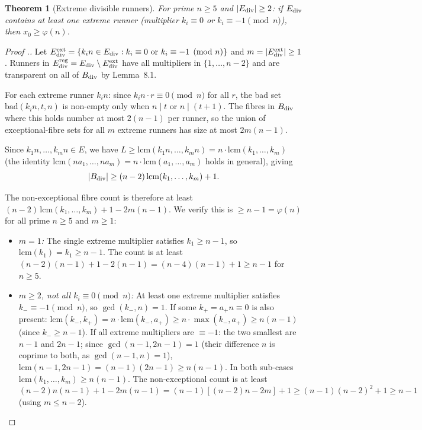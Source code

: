 \documentclass[11pt,a4paper]{article}
\theoremstyle{plain}
\newtheorem{theorem}{Theorem}[section]
\theoremstyle{definition}
\theoremstyle{remark}
\begin{document}
\begin{theorem}[Extreme divisible runners]
For prime $n \geq 5$ and $|E_{\rm div}| \geq 2$: if $E_{\rm div}$ contains at least one extreme runner (multiplier $k_i \equiv 0$ or $k_i \equiv -1 \pmod{n}$), then $x_0 \geq \varphi(n)$.

\end{theorem}

\begin{proof}[Proof .]
Let $E_{\rm div}^{\rm ext} = \{k_i n \in E_{\rm div} : k_i \equiv 0 \text{ or } k_i \equiv -1 \pmod{n}\}$ and $m = |E_{\rm div}^{\rm ext}| \geq 1$. Runners in $E_{\rm div}^{\rm reg} = E_{\rm div} \setminus E_{\rm div}^{\rm ext}$ have all multipliers in $\{1,\ldots,n-2\}$ and are transparent on all of $B_{\rm div}$ by Lemma~8.1.

For each extreme runner $k_i n$: since $k_i n \cdot r \equiv 0 \pmod{n}$ for all $r$, the bad set $\mathrm{bad}(k_i n, t, n)$ is non-empty only when $n \mid t$ or $n \mid (t+1)$. The fibres in $B_{\rm div}$ where this holds number at most $2(n-1)$ per runner, so the union of exceptional-fibre sets for all $m$ extreme runners has size at most $2m(n-1)$.

Since $k_1 n, \ldots, k_m n \in E$, we have $L \geq \mathrm{lcm}(k_1 n, \ldots, k_m n) = n\cdot\mathrm{lcm}(k_1,\ldots,k_m)$ (the identity $\mathrm{lcm}(na_1,\ldots,na_m) = n\cdot\mathrm{lcm}(a_1,\ldots,a_m)$ holds in general), giving
\[|B_{\rm div}| \geq (n-2)\,\mathrm{lcm}(k_1,\ldots,k_m)+1.\]

The non-exceptional fibre count is therefore at least $(n-2)\,\mathrm{lcm}(k_1,\ldots,k_m)+1-2m(n-1)$. We verify this is $\geq n-1 = \varphi(n)$ for all prime $n \geq 5$ and $m \geq 1$:

\begin{itemize}
\item \textit{$m = 1$:} The single extreme multiplier satisfies $k_1 \geq n-1$, so $\mathrm{lcm}(k_1) = k_1 \geq n-1$. The count is at least $(n-2)(n-1)+1-2(n-1) = (n-4)(n-1)+1 \geq n-1$ for $n \geq 5$. \checkmark
\end{itemize}

\begin{itemize}
\item \textit{$m \geq 2$, not all $k_i \equiv 0 \pmod{n}$:} At least one extreme multiplier satisfies $k_- \equiv -1 \pmod{n}$, so $\gcd(k_-,n)=1$. If some $k_+ = a_+ n \equiv 0$ is also present: $\mathrm{lcm}(k_-,k_+) = n\cdot\mathrm{lcm}(k_-,a_+) \geq n\cdot\max(k_-,a_+) \geq n(n-1)$ (since $k_- \geq n-1$). If all extreme multipliers are $\equiv -1$: the two smallest are $n-1$ and $2n-1$; since $\gcd(n-1,2n-1)=1$ (their difference $n$ is coprime to both, as $\gcd(n-1,n)=1$), $\mathrm{lcm}(n-1,2n-1)=(n-1)(2n-1)\geq n(n-1)$. In both sub-cases $\mathrm{lcm}(k_1,\ldots,k_m)\geq n(n-1)$. The non-exceptional count is at least $(n-2)n(n-1)+1-2m(n-1)=(n-1)[(n-2)n-2m]+1\geq(n-1)(n-2)^2+1\geq n-1$ (using $m\leq n-2$). \checkmark
\end{itemize}


\end{proof}
\end{document}
